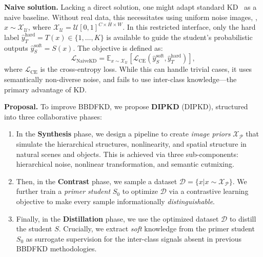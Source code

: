 \begin{foldable} %
  \textbf{Naive solution.}
  Lacking a direct solution, one might adapt standard \ac{KD}~\cite{hinton2015distilling} as a naive baseline.
  Without real data, this necessitates using uniform noise images, \eg, $x \sim \mathcal{X}_\mathcal{U}$, where $\mathcal{X}_\mathcal{U} = \mathcal{U}[0,1]^{C\times H\times W}$.
  In this restricted interface, only the hard label $\hat{y}_{T}^\text{hard} = T(x) \in \{1, \ldots, K\}$ is available to guide the student's probabilistic outputs $\hat{y}_{S}^\text{soft} = S(x)$.
  The objective is defined as:
  \begin{equation} \label{eq:loss-naive-kd}
    \mathcal{L}_\text{NaiveKD} = \mathbb{E}_{x \sim \mathcal{X}_\mathcal{U}} \left[\mathcal{L}_\text{CE} \left(\hat{y}_{S}^\text{soft}, \hat{y}_{T}^\text{hard} \right)\right],
  \end{equation}
  where $\mathcal{L}_\text{CE}$ is the cross-entropy loss.
  While this can handle trivial cases, it uses semantically non-diverse noise, and fails to use inter-class knowledge---the primary advantage of \ac{KD}.
\end{foldable}

\begin{foldable} %
  \textbf{Proposal.}
  To improve BBDFKD, we propose \textbf{\acl{DIPKD}} (\acs{DIPKD}), structured into three collaborative phases:
  \begin{enumerate}
    \item {
        In the \textbf{Synthesis} phase, we design a pipeline to create \textit{image priors} $\mathcal{X}_\mathcal{P}$ that simulate the hierarchical structures, nonlinearity, and spatial structure in natural scenes and objects.
        This is achieved via three sub-components: hierarchical noise, nonlinear transformation, and semantic cutmixing.
      }
    \item {
        Then, in the \textbf{Contrast} phase, we sample a dataset $\mathcal{D} = \{x | x \sim \mathcal{X}_\mathcal{P}\}$.
        We further train a \textit{primer student} $S_0$ to optimize $\mathcal{D}$ via a contrastive learning objective to make every sample informationally \textit{distinguishable}.
      }
    \item {
        Finally, in the \textbf{Distillation} phase, we use the optimized dataset $\mathcal{D}$ to distill the student $S$.
        Crucially, we extract \textit{soft} knowledge from the primer student $S_0$ as surrogate supervision for the inter-class signals absent in previous BBDFKD methodologies.
      }
  \end{enumerate}
\end{foldable}

